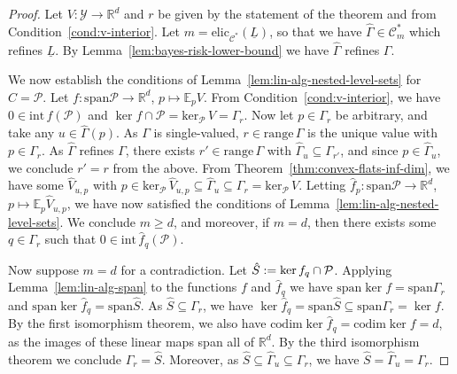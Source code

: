\documentclass{article} %
\newcommand{\Comments}{0}
\newcommand{\mytodo}[2]{\ifnum\Comments=1%
	\todo[linecolor=#1!80!black,backgroundcolor=#1,bordercolor=#1!80!black]{#2}\fi}
\newcommand{\btw}[1]{}%
\newcommand{\reals}{\mathbb{R}}
\newcommand{\interior}{\mathrm{int}\,}
\newcommand{\elic}{\mathrm{elic}}
\newcommand{\spn}{\mathrm{span}}
\newcommand{\range}{\mathrm{range}\,}
\newcommand{\zeros}[1]{\mathrm{ker}_\P\,#1}
\newcommand{\codim}{\mathrm{codim}}
\newcommand{\C}{\mathcal{C}}
\newcommand{\E}{\mathbb{E}}
\renewcommand{\P}{\mathcal{P}}
\newcommand{\Y}{\mathcal{Y}}
\newcommand{\lbar}{\underline{L}} %
\newtheorem{theorem}{Theorem}
\begin{document}
\bayesrisklowerbound*
\begin{proof}
  Let $V:\Y\to\reals^d$ and $r$ be given by the statement of the theorem and from Condition~\ref{cond:v-interior}.
  Let $m = \elic_{\C^*}(\lbar)$, so that we have $\hat\Gamma\in\C^*_m$ which refines $\lbar$.
  By Lemma~\ref{lem:bayes-risk-lower-bound} we have $\hat\Gamma$ refines $\Gamma$.

  \btw{Notes to self about the proof commented out here}

  We now establish the conditions of Lemma~\ref{lem:lin-alg-nested-level-sets} for $C=\P$.
  Let $f:\spn \P \to \reals^d$, $p \mapsto \E_pV$.
  From Condition~\ref{cond:v-interior}, we have $0\in\interior f(\P)$ and $\ker f \cap \P = \zeros{V} = \Gamma_r$.
  Now let $p\in\Gamma_r$ be arbitrary, and take any $u\in\hat\Gamma(p)$.
  As $\Gamma$ is single-valued, $r\in\range\Gamma$ is the unique value with $p\in\Gamma_r$.
  As $\hat\Gamma$ refines $\Gamma$, there exists $r'\in\range\Gamma$ with $\hat\Gamma_u \subseteq \Gamma_{r'}$, and since $p\in\hat\Gamma_u$, we conclude $r'=r$ from the above.
  From Theorem~\ref{thm:convex-flats-inf-dim}, we have some $\hat V_{u,p}$ with $p\in\zeros{\hat V_{u,p}} \subseteq \hat\Gamma_u \subseteq \Gamma_r = \zeros{V}$.
  Letting $\hat f_p:\spn \P \to \reals^d$, $p \mapsto \E_p\hat V_{u,p}$, we have now satisfied the conditions of Lemma~\ref{lem:lin-alg-nested-level-sets}.
  We conclude $m \geq d$, and moreover, if $m=d$, then there exists some $q\in\Gamma_r$ such that $0 \in\interior\hat f_q(\P)$.
    
  Now suppose $m = d$ for a contradiction.
  Let $\hat S\defeq \ker f_q\cap \P$.
  Applying Lemma~\ref{lem:lin-alg-span} to the functions $f$ and $\hat f_q$
  we have $\spn \ker f = \spn \Gamma_r$ and $\spn \ker \hat f_q = \spn \hat S$.
  As $\hat S \subseteq \Gamma_r$, we have $\ker \hat f_q = \spn \hat S \subseteq \spn \Gamma_r = \ker f$.
  By the first isomorphism theorem, we also have $\codim \ker \hat f_q = \codim \ker f = d$, as the images of these linear maps span all of $\reals^d$.
  By the third isomorphism theorem we conclude $\Gamma_r = \hat S$.
  Moreover, as $\hat S \subseteq \hat\Gamma_u \subseteq \Gamma_r$, we have $\hat S = \hat\Gamma_u = \Gamma_r$.


\end{proof}
\end{document}
